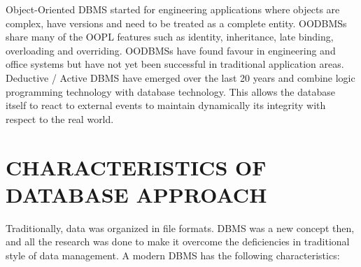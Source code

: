 Object-Oriented DBMS started for engineering applications where objects are complex,
have versions and need to be treated as a complete entity. OODBMSs share many of the OOPL features such as identity, inheritance, late binding, overloading and overriding.
OODBMSs have found favour in engineering and office systems but have not yet been successful in traditional application areas. Deductive / Active DBMS have emerged over the last 20 years and combine logic programming technology with database technology. This allows the database itself to react to external events to maintain dynamically its integrity with respect to the real world.

\thispagestyle{fancy}

\section{CHARACTERISTICS OF DATABASE APPROACH}
Traditionally, data was organized in file formats. DBMS was a new concept then, and all the research was done to make it overcome the deficiencies in traditional style of data management. A modern DBMS has the following characteristics:
